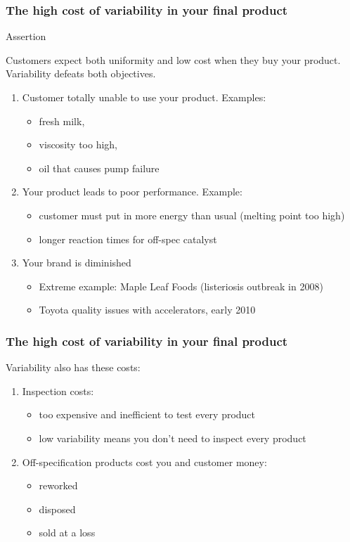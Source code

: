 \begin{frame}\frametitle{The high cost of variability in your final product}
	\begin{block}
		{Assertion}
		\begin{center}
			Customers expect both uniformity and low cost when they buy your product. Variability defeats both objectives.
		\end{center}
	\end{block}
	\begin{enumerate}
		\item Customer totally unable to use your product. Examples:
		\begin{itemize}
			\item fresh milk,
			\item viscosity too high,
			\item oil that causes pump failure
		\end{itemize}
		\item Your product leads to poor performance. Example:
		\begin{itemize}
			\item customer must put in more energy than usual (melting point too high)
			\item longer reaction times for off-spec catalyst
		\end{itemize}
		\item Your brand is diminished
		\begin{itemize}
			\item Extreme example: Maple Leaf Foods (listeriosis outbreak in 2008)
			\item Toyota quality issues with accelerators, early 2010
		\end{itemize}
	\end{enumerate}
\end{frame}

\begin{frame}\frametitle{The high cost of variability in your final product}
	Variability also has these costs:
	\begin{enumerate}
		\item Inspection costs:
		\begin{itemize}
			\item too expensive and inefficient to test every product
			\item low variability means you don't need to inspect every product
		\end{itemize}
		\item Off-specification products cost you and customer money:
		\begin{itemize}
			\item reworked
			\item disposed
			\item sold at a loss
		\end{itemize}
	\end{enumerate}
\end{frame}

